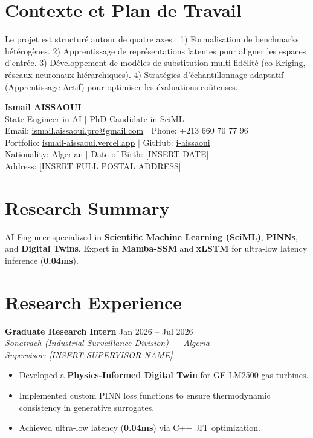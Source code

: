 \documentclass[a4paper,11pt]{article}
\begin{document}
\section{Contexte et Plan de Travail}
Le projet est structuré autour de quatre axes : 1) Formalisation de benchmarks hétérogènes. 2) Apprentissage de représentations latentes pour aligner les espaces d'entrée. 3) Développement de modèles de substitution multi-fidélité (co-Kriging, réseaux neuronaux hiérarchiques). 4) Stratégies d'échantillonnage adaptatif (Apprentissage Actif) pour optimiser les évaluations coûteuses.

\newpage

\begin{center}
    {\Huge\bfseries\color{titleblue} Ismail AISSAOUI}\\[4pt]
    {\large State Engineer in AI $|$ PhD Candidate in SciML}\\[6pt]
    \normalsize
    Email: \href{mailto:ismail.aissaoui.pro@gmail.com}{ismail.aissaoui.pro@gmail.com} $|$ Phone: +213 660 70 77 96 \\
    Portfolio: \href{https://ismail-aissaoui.vercel.app}{ismail-aissaoui.vercel.app} $|$ GitHub: \href{https://github.com/i-aissaoui}{i-aissaoui} \\
    Nationality: Algerian $|$ Date of Birth: [INSERT DATE] \\
    Address: [INSERT FULL POSTAL ADDRESS]
\end{center}

\section{Research Summary}
AI Engineer specialized in \textbf{Scientific Machine Learning (SciML)}, \textbf{PINNs}, and \textbf{Digital Twins}. Expert in \textbf{Mamba-SSM} and \textbf{xLSTM} for ultra-low latency inference (\textbf{0.04ms}).

\section{Research Experience}
\textbf{Graduate Research Intern} \hfill Jan 2026 -- Jul 2026 \\
\textit{Sonatrach (Industrial Surveillance Division) — Algeria} \\
\textit{Supervisor: [INSERT SUPERVISOR NAME]}
\begin{itemize}
    \item Developed a \textbf{Physics-Informed Digital Twin} for GE LM2500 gas turbines.
    \item Implemented custom PINN loss functions to ensure thermodynamic consistency in generative surrogates.
    \item Achieved ultra-low latency (\textbf{0.04ms}) via C++ JIT optimization.
\end{itemize}
\end{document}
